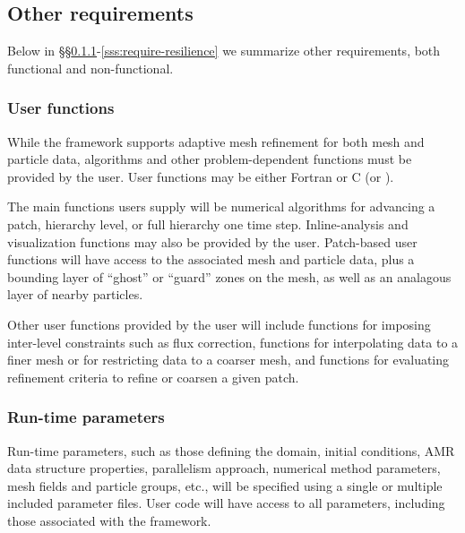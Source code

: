 \documentclass[10pt,twocolumn]{article}
\begin{document}
\subsection{Other requirements} \label{ss:require-other}

Below in \S\S\ref{sss:require-user}-\ref{sss:require-resilience} we
summarize other requirements, both functional and non-functional.
  
\subsubsection{User functions} \label{sss:require-user}

While the framework supports adaptive mesh refinement for both mesh
and particle data, algorithms and other problem-dependent functions
must be provided by the user.  User functions may be either Fortran or
C (or \cpp).  

The main functions users supply will be numerical algorithms for
advancing a patch, hierarchy level, or full hierarchy one time step.
Inline-analysis and visualization functions may also be provided by
the user.  Patch-based user functions will have access to the
associated mesh and particle data, plus a bounding layer of ``ghost''
or ``guard'' zones on the mesh, as well as an analagous layer of
nearby particles.

Other user functions provided by the user will include functions for
imposing inter-level constraints such as flux correction, functions
for interpolating data to a finer mesh or for restricting data to a
coarser mesh, and functions for evaluating refinement criteria to
refine or coarsen a given patch.



\subsubsection{Run-time parameters} \label{sss:require-parameters}

Run-time parameters, such as those defining the domain, initial
conditions, AMR data structure properties, parallelism approach,
numerical method parameters, mesh fields and particle groups, etc.,
will be specified using a single or multiple included parameter files.
User code will have access to all parameters, including those
associated with the framework.
\end{document}
